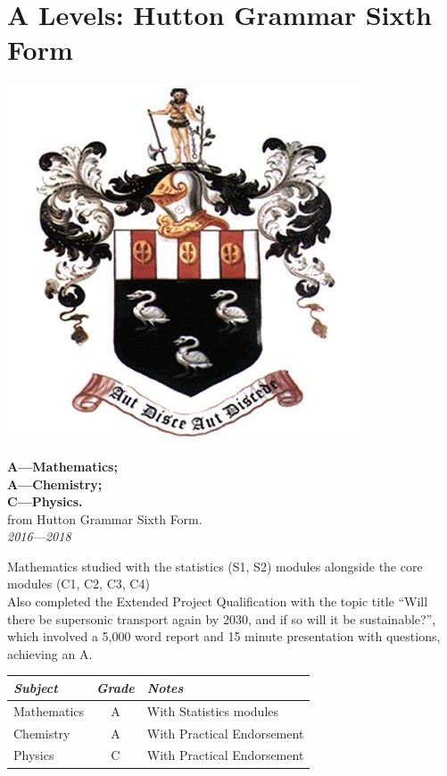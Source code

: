 \documentclass[9pt,a4paper]{article}
\begin{document}
\section{A Levels: Hutton Grammar Sixth Form}
\begin{center}
	\includegraphics[height=0.15\textheight]{hgs.jpg}
\end{center}
\begin{center}
	\noindent\textbf{A---Mathematics; \\A---Chemistry; \\C---Physics.}\\
	\noindent from Hutton Grammar Sixth Form.\\
	\noindent\emph{2016---2018}
\end{center}

Mathematics studied with the statistics (S1, S2) modules alongside the core modules (C1, C2, C3, C4)\\\linebreak
Also completed the Extended Project Qualification with the topic title ``Will there be supersonic transport again by 2030, and if so will it be sustainable?'', which involved a 5,000 word report and 15 minute presentation with questions, achieving an A.
\\\linebreak
\noindent
\begin{center}\begin{tabular}{p{3.2cm}|c|p{4.5cm}}
	\emph{Subject}&\emph{Grade}&\emph{Notes}\\\hline\hline
	Mathematics & A & With Statistics modules \\
	Chemistry 	& A & With Practical Endorsement\\
	Physics 	& C & With Practical Endorsement
\end{tabular}\end{center}
\end{document}
